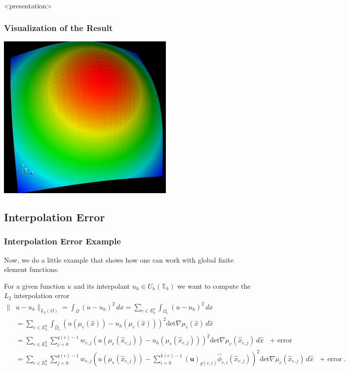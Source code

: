 \begin{frame}<presentation>
\frametitle<presentation>{Visualization of the Result}
\begin{center}
\includegraphics[width=0.65\textwidth]{./EPS/q1interpolate}
\end{center}
\end{frame}



\subsection{Interpolation Error}

\begin{frame}
\frametitle<presentation>{Interpolation Error Example}
Now, we do a little example that shows how one can work with global
finite element functions.

For a given function $u$ and its interpolant $u_h\in
U_h(\mathbb{T}_h)$ we want to compute the $L_2$ interpolation error 
\begin{equation*}
\begin{split}
\|&u-u_h\|_{L_2(\Omega)} = \int_\Omega (u-u_h)^2\, dx 
= \sum_{e\in E_h^0} \int_{\Omega_e} (u-u_h)^2\, dx \\
&= \sum_{e\in E_h^0} \int_{\hat{\Omega}_e} \left(u(\mu_e(\hat{x})) -
u_h(\mu_e(\hat{x})) \right)^2 \text{det} \nabla\mu_e(\hat{x}) \,
d\hat{x}\\
&= \sum_{e\in E_h^0} \sum_{j=0}^{q(e)-1} w_{e,j} \left( u(\mu_e(\hat{x}_{e,j})) -
u_h(\mu_e(\hat{x}_{e,j})) \right)^2 \text{det} \nabla\mu_e(\hat{x}_{e,j}) \,
d\hat{x} \text{ $+$ error}\\
&= \sum_{e\in E_h^0} \sum_{j=0}^{q(e)-1} w_{e,j} \left(u(\mu_e(\hat{x}_{e,j})) -
\sum_{i=0}^{k(e)-1}(\mathbf{u})_{g(e,i)} \hat\phi_{e,i}(\hat{x}_{e,j}) \right)^2  
\text{det} \nabla\mu_e(\hat{x}_{e,j}) \,  
d\hat{x} \text{ $+$ error} .
\end{split}
\end{equation*}
\end{frame}

